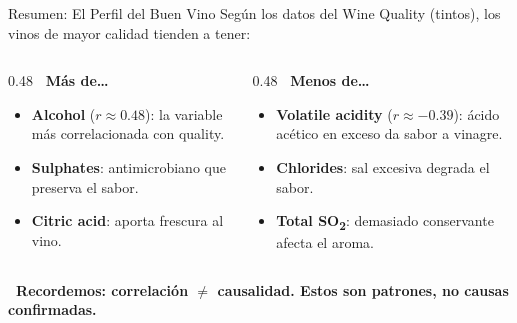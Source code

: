\documentclass[aspectratio=169, 11pt]{beamer}
\begin{document}
\begin{frame}[shrink=5]{Resumen: El Perfil del Buen Vino}
  \vspace{-4pt}
  {\footnotesize
    Según los datos del Wine Quality (tintos), los vinos de mayor calidad tienden a tener:}

  \vspace{6pt}
  \begin{columns}[T]
    \begin{column}{0.48\textwidth}
      {\footnotesize\bfseries\color{codeGreen} \faArrowUp\ Más de\ldots}
      \vspace{4pt}

      {\scriptsize
      \begin{itemize}\setlength{\itemsep}{5pt}
        \item[{\color{codeGreen}\scriptsize\faCheckCircle}]
          \textbf{Alcohol} ($r \approx 0.48$): la variable más
          correlacionada con quality.
        \item[{\color{codeGreen}\scriptsize\faCheckCircle}]
          \textbf{Sulphates}: antimicrobiano que preserva el sabor.
        \item[{\color{codeGreen}\scriptsize\faCheckCircle}]
          \textbf{Citric acid}: aporta frescura al vino.
      \end{itemize}
      }
    \end{column}

    \begin{column}{0.48\textwidth}
      {\footnotesize\bfseries\color{arcaRed} \faArrowDown\ Menos de\ldots}
      \vspace{4pt}

      {\scriptsize
      \begin{itemize}\setlength{\itemsep}{5pt}
        \item[{\color{arcaRed}\scriptsize\faTimesCircle}]
          \textbf{Volatile acidity} ($r \approx -0.39$): ácido acético
          en exceso da sabor a vinagre.
        \item[{\color{arcaRed}\scriptsize\faTimesCircle}]
          \textbf{Chlorides}: sal excesiva degrada el sabor.
        \item[{\color{arcaRed}\scriptsize\faTimesCircle}]
          \textbf{Total SO\textsubscript{2}}: demasiado conservante
          afecta el aroma.
      \end{itemize}
      }
    \end{column}
  \end{columns}

  \vspace{6pt}
  {\scriptsize\color{arcaDark}\bfseries
    \faExclamationTriangle\ Recordemos: correlación $\neq$ causalidad.
    Estos son \textbf{patrones}, no causas confirmadas.}
\end{frame}
\end{document}

